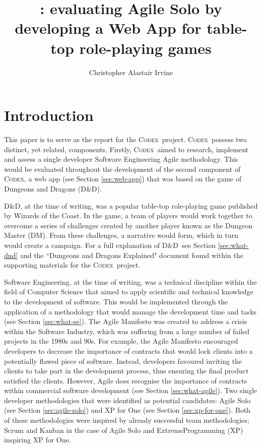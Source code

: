 \documentclass[final]{cmpreport}
\title{\Codex: evaluating Agile Solo by developing a Web App for table-top role-playing games}
\author{Christopher Alastair Irvine}
\newcommand{\WotC}{Wizards of the Coast}
\newcommand{\dnd}{D\&D}
\newcommand{\Codex}{\textsc{Codex}}
\begin{document}
	
	\section{Introduction} \label{sec:introduction}
	This paper is to serve as the report for the \Codex \ project. \Codex \ possess two distinct, yet related, components. Firstly, \Codex \ aimed to research, implement and assess a single developer Software Engineering Agile methodology. This would be evaluated throughout the development of the second component of \Codex, a web app (see Section \ref{sec:web-app}) that was based on the game of Dungeons and Dragons (\dnd). 
	
	\dnd, at the time of writing, was a popular table-top role-playing game published by \WotC. In the game, a team of players would work together to overcome a series of challenges created by another player known as the Dungeon Master (DM). From these challenges, a narrative would form, which in turn would create a campaign. For a full explanation of \dnd \ see Section \ref{sec:what-dnd} and the ``Dungeons and Dragons Explained" document found within the supporting materials for the \Codex \ project. 
	
	Software Engineering, at the time of writing, was a technical discipline within the field of Computer Science that aimed to apply scientific and technical knowledge to the development of software. This would be implemented through the application of a methodology that would manage the development time and tasks (see Section \ref{sec:what-se}). The Agile Manifesto was created to address a crisis within the Software Industry, which was suffering from a large number of failed projects in the 1980s and 90s. For example, the Agile Manifesto encouraged developers to decrease the importance of contracts that would lock clients into a potentially flawed piece of software. Instead, developers favoured inviting the clients to take part in the development process, thus ensuring the final product satisfied the clients. However, Agile does recognise the importance of contracts within commercial software development (see Section \ref{sec:what-agile}). Two single developer methodologies that were identified as potential candidates: Agile Solo (see Section \ref{sec:agile-solo}) and XP for One (see Section \ref{sec:xp-for-one}). Both of these methodologies were inspired by already successful team methodologies; Scrum and Kanban in the case of Agile Solo and ExtremeProgramming (XP) inspiring XP for One. 
	
\end{document}
